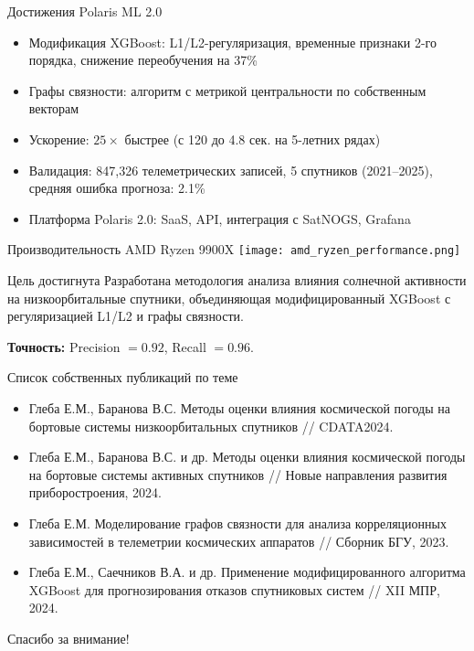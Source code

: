 \documentclass[aspectratio=43]{beamer}
\begin{document}
\begin{frame}{Достижения Polaris ML 2.0}
  \begin{itemize}
    \item  Модификация XGBoost: L1/L2-регуляризация, временные признаки 2-го порядка, снижение переобучения на 37\%
    \item  Графы связности: алгоритм с метрикой центральности по собственным векторам
    \item  Ускорение: $25 \times$ быстрее (с 120 до 4.8 сек. на 5-летних рядах)
    \item  Валидация: 847,326 телеметрических записей, 5 спутников (2021--2025), средняя ошибка прогноза: 2.1\%
    \item  Платформа Polaris 2.0: SaaS, API, интеграция с SatNOGS, Grafana
  \end{itemize}
\end{frame}

\begin{frame}{Производительность AMD Ryzen 9900X}
  \centering
  \texttt{[image: amd\_ryzen\_performance.png]}
\end{frame}

\begin{frame}{Цель достигнута}
  Разработана методология анализа влияния солнечной активности на низкоорбитальные спутники, объединяющая модифицированный XGBoost с регуляризацией L1/L2 и графы связности.
  \vspace{1em}
  
  \textbf{Точность:} Precision $=0.92$, Recall $=0.96$.
\end{frame}

\begin{frame}{Список собственных публикаций по теме}
  \begin{itemize}
    \item Глеба Е.М., Баранова В.С. Методы оценки влияния космической погоды на бортовые системы низкоорбитальных спутников // CDATA2024.
    \item Глеба Е.М., Баранова В.С. и др. Методы оценки влияния космической погоды на бортовые системы активных спутников // Новые направления развития приборостроения, 2024.
    \item Глеба Е.М. Моделирование графов связности для анализа корреляционных зависимостей в телеметрии космических аппаратов // Сборник БГУ, 2023.
    \item Глеба Е.М., Саечников В.А. и др. Применение модифицированного алгоритма XGBoost для прогнозирования отказов спутниковых систем // XII МПР, 2024.
  \end{itemize}
\end{frame}

\begin{frame}[plain]
  \centering
  \vspace{2em}
  \LARGE Спасибо за внимание!
\end{frame}
\end{document}

